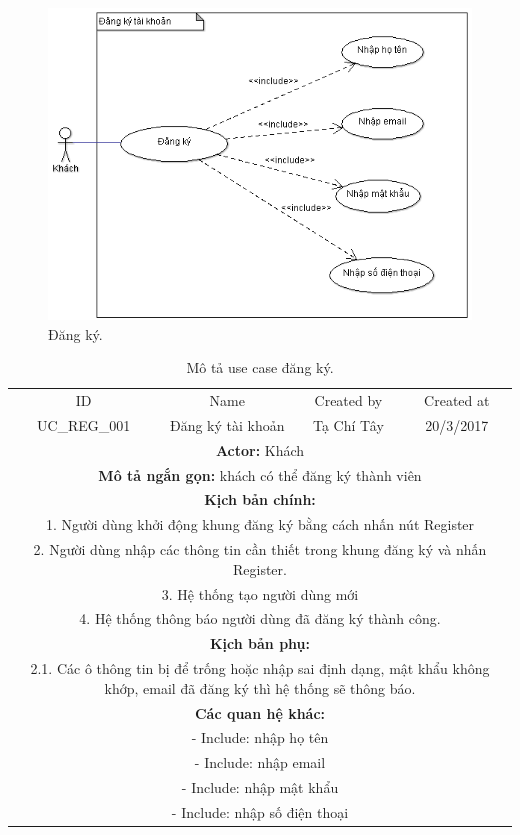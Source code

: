 \documentclass[a4paper,12pt,oneside]{article}
\begin{document}
\newpage
\begin{figure}[htp]
\centering
\includegraphics[scale=.9]{hinh/reg.png}
\caption{Đăng ký.}
\end{figure}

\begin{table}[!htp]
\centering
\begin{tabularx}{\linewidth}{ |c||c|c|c| }
\hline
ID & Name & Created by & Created at\\
UC\_REG\_001 & Đăng ký tài khoản & Tạ Chí Tây & 20/3/2017\\
\hline
\multicolumn{4}{|X|}{\textbf{Actor:} Khách }\\
\hline
\multicolumn{4}{|X|}{\textbf{Mô tả ngắn gọn:} khách có thể đăng ký thành viên }\\
\hline
\multicolumn{4}{|X|}{\textbf{Kịch bản chính:}}\\
\multicolumn{4}{|X|}{1. Người dùng khởi động khung đăng ký bằng cách nhấn nút Register}\\
\multicolumn{4}{|X|}{
2.	Người dùng nhập các thông tin cần thiết trong khung đăng ký và nhấn Register.}\\
\multicolumn{4}{|X|}{
3.	Hệ thống tạo người dùng mới}\\
\multicolumn{4}{|X|}{
4.	Hệ thống thông báo người dùng đã đăng ký thành công.}\\
\hline
\multicolumn{4}{|X|}{\textbf{Kịch bản phụ:}}\\
\multicolumn{4}{|X|}{2.1. Các ô thông tin bị để trống hoặc nhập sai định dạng, mật khẩu không khớp, email đã đăng ký thì hệ thống sẽ thông báo.}\\
\hline
\multicolumn{4}{|X|}{\textbf{Các quan hệ khác:}}\\
\multicolumn{4}{|X|}{- Include: nhập họ tên}\\
\multicolumn{4}{|X|}{- Include: nhập email}\\
\multicolumn{4}{|X|}{- Include: nhập mật khẩu}\\
\multicolumn{4}{|X|}{- Include: nhập số điện thoại}\\
\hline
\end{tabularx}
\caption{Mô tả use case đăng ký.}
\end{table}
\end{document}
